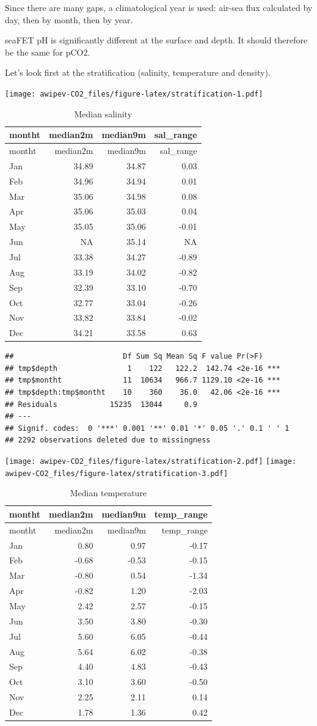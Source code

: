 \documentclass[
]{article}
\begin{document}
Since there are many gaps, a climatological year is used: air-sea flux
calculated by day, then by month, then by year.

seaFET pH is significantly different at the surface and depth. It should
therefore be the same for pCO2.

Let's look first at the stratification (salinity, temperature and
density).

\texttt{[image: awipev-CO2\_files/figure-latex/stratification-1.pdf]}

\begin{longtable}[]{@{}lrrr@{}}
\caption{Median salinity}\tabularnewline
\toprule
montht & median2m & median9m & sal\_range\tabularnewline
\midrule
\endfirsthead
\toprule
montht & median2m & median9m & sal\_range\tabularnewline
\midrule
\endhead
Jan & 34.89 & 34.87 & 0.03\tabularnewline
Feb & 34.96 & 34.94 & 0.01\tabularnewline
Mar & 35.06 & 34.98 & 0.08\tabularnewline
Apr & 35.06 & 35.03 & 0.04\tabularnewline
May & 35.05 & 35.06 & -0.01\tabularnewline
Jun & NA & 35.14 & NA\tabularnewline
Jul & 33.38 & 34.27 & -0.89\tabularnewline
Aug & 33.19 & 34.02 & -0.82\tabularnewline
Sep & 32.39 & 33.10 & -0.70\tabularnewline
Oct & 32.77 & 33.04 & -0.26\tabularnewline
Nov & 33.82 & 33.84 & -0.02\tabularnewline
Dec & 34.21 & 33.58 & 0.63\tabularnewline
\bottomrule
\end{longtable}

\begin{verbatim}
##                         Df Sum Sq Mean Sq F value Pr(>F)    
## tmp$depth                1    122   122.2  142.74 <2e-16 ***
## tmp$montht              11  10634   966.7 1129.10 <2e-16 ***
## tmp$depth:tmp$montht    10    360    36.0   42.06 <2e-16 ***
## Residuals            15235  13044     0.9                   
## ---
## Signif. codes:  0 '***' 0.001 '**' 0.01 '*' 0.05 '.' 0.1 ' ' 1
## 2292 observations deleted due to missingness
\end{verbatim}

\texttt{[image: awipev-CO2\_files/figure-latex/stratification-2.pdf]}
\texttt{[image: awipev-CO2\_files/figure-latex/stratification-3.pdf]}

\begin{longtable}[]{@{}lrrr@{}}
\caption{Median temperature}\tabularnewline
\toprule
montht & median2m & median9m & temp\_range\tabularnewline
\midrule
\endfirsthead
\toprule
montht & median2m & median9m & temp\_range\tabularnewline
\midrule
\endhead
Jan & 0.80 & 0.97 & -0.17\tabularnewline
Feb & -0.68 & -0.53 & -0.15\tabularnewline
Mar & -0.80 & 0.54 & -1.34\tabularnewline
Apr & -0.82 & 1.20 & -2.03\tabularnewline
May & 2.42 & 2.57 & -0.15\tabularnewline
Jun & 3.50 & 3.80 & -0.30\tabularnewline
Jul & 5.60 & 6.05 & -0.44\tabularnewline
Aug & 5.64 & 6.02 & -0.38\tabularnewline
Sep & 4.40 & 4.83 & -0.43\tabularnewline
Oct & 3.10 & 3.60 & -0.50\tabularnewline
Nov & 2.25 & 2.11 & 0.14\tabularnewline
Dec & 1.78 & 1.36 & 0.42\tabularnewline
\bottomrule
\end{longtable}
\end{document}
